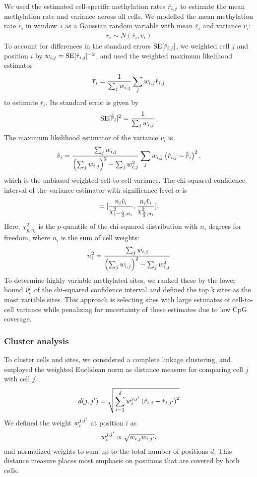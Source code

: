 We used the estimated cell-specific methylation rates $\hat{r}_{i,j}$ to estimate the mean methylation rate and variance across all cells. We modelled the mean methylation rate $r_i$ in window~$i$ as a Gaussian random variable with mean $\overline{r}_i$ and variance $v_i$:
\begin{align}
  r_i \sim N(\overline{r}_i, v_i)
\end{align}
To account for differences in the standard errors $\operatorname{SE}[\hat{r}_{i,j}]$, we weighted cell $j$ and position $i$ by $w_{i,j}=\operatorname{SE}[\hat{r}_{i,j}]^{-2}$, and used the weighted maximum likelihood estimator
\begin{align}
  \hat{\overline{r}}_i = \frac{1}{\sum_j w_{i,j}} \sum_j w_{i,j}\hat{r}_{i,j}
\end{align}
to estimate $\overline{r}_i$. Its standard error is given by
\begin{align}
  \operatorname{SE}[\hat{\overline{r}}_i]^2 = \frac{1}{\sum_j w_{i,j}}.
\end{align}
The maximum likelihood estimator of the variance $v_i$ is
\begin{align} \label{eq:bs_var}
  \hat{v}_i = \frac{\sum_j w_{i,j}}{\left(\sum_j w_{i,j}\right)^2 - \sum_j w_{i,j}^2} \sum_j w_{i,j} \left(\hat{r}_{i,j} - \hat{\overline{r}}_i\right)^2,
\end{align}
which is the unbiased weighted cell-to-cell variance. The chi-squared confidence interval of the variance estimator with significance level $\alpha$ is
\begin{align}
  [\Xrvli, \Xrvui] = [\frac{n_i \Xrvi}{\chi^2_{1-\frac{\alpha}{2}, n_i}},
  \frac{n_i \Xrvi}{\chi^2_{\frac{\alpha}{2}, n_i}}].
\end{align}
Here, $\chi^2_{p, n_i}$ is the $p$-quantile of the chi-squared distribution with $n_i$ degrees for freedom, where $n_i$ is the sum of cell weights:
\begin{align}
  n_i^2 = \frac{\sum_j w_{i,j}}{\left(\sum_j w_{i,j}\right)^2 - \sum_j w_{i,j}^2}
\end{align}
To determine highly variable methylated sites, we ranked these by the lower bound $\hat{v}^l_i$ of the chi-squared confidence interval and defined the top k sites as the most variable sites. This approach is selecting sites with large estimates of cell-to-cell variance while penalizing for uncertainty of these estimates due to low CpG coverage.

\subsubsection{Cluster analysis}

To cluster cells and sites, we considered a complete linkage clustering, and employed the weighted Euclidean norm as distance measure for comparing cell $j$ with cell $j^\prime$:
\begin{align} \label{eq:bs_clust}
  d(j, j^\prime) = \sqrt{\sum_{i=1}^d w^{j,j^\prime}_i \left(\hat{r}_{i,j} - \hat{r}_{i, j^\prime}\right)^2}
\end{align}
We defined the weight $w^{j,j^\prime}_i$ at position $i$ as
\begin{align}
  w^{j,j^\prime}_i \propto \sqrt{w_{i,j}w_{i,j^\prime}},
\end{align}
and normalized weights to sum up to the total number of positions $d$. This distance measure places most emphasis on positions that are covered by both cells.


